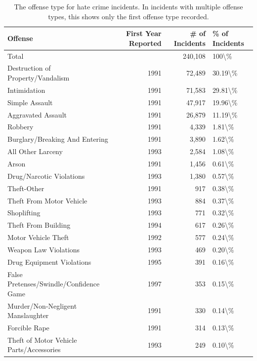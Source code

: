 \documentclass[
  12pt,
  openany]{book}
\begin{document}
\begin{longtable}[t]{lrrl}
\caption{\label{tab:hateOffense}The offense type for hate crime incidents. In incidents with multiple offense types, this shows only the first offense type recorded.}\\
\toprule
Offense & First Year Reported & \# of Incidents & \% of Incidents\\
\midrule
Total &  & 240,108 & 100\textbackslash{}\%\\
Destruction of Property/Vandalism & 1991 & 72,489 & 30.19\textbackslash{}\%\\
Intimidation & 1991 & 71,583 & 29.81\textbackslash{}\%\\
Simple Assault & 1991 & 47,917 & 19.96\textbackslash{}\%\\
Aggravated Assault & 1991 & 26,879 & 11.19\textbackslash{}\%\\
\addlinespace
Robbery & 1991 & 4,339 & 1.81\textbackslash{}\%\\
Burglary/Breaking And Entering & 1991 & 3,890 & 1.62\textbackslash{}\%\\
All Other Larceny & 1993 & 2,584 & 1.08\textbackslash{}\%\\
Arson & 1991 & 1,456 & 0.61\textbackslash{}\%\\
Drug/Narcotic Violations & 1993 & 1,380 & 0.57\textbackslash{}\%\\
\addlinespace
Theft-Other & 1991 & 917 & 0.38\textbackslash{}\%\\
Theft From Motor Vehicle & 1993 & 884 & 0.37\textbackslash{}\%\\
Shoplifting & 1993 & 771 & 0.32\textbackslash{}\%\\
Theft From Building & 1994 & 617 & 0.26\textbackslash{}\%\\
Motor Vehicle Theft & 1992 & 577 & 0.24\textbackslash{}\%\\
\addlinespace
Weapon Law Violations & 1993 & 469 & 0.20\textbackslash{}\%\\
Drug Equipment Violations & 1995 & 391 & 0.16\textbackslash{}\%\\
False Pretenses/Swindle/Confidence Game & 1997 & 353 & 0.15\textbackslash{}\%\\
Murder/Non-Negligent Manslaughter & 1991 & 330 & 0.14\textbackslash{}\%\\
Forcible Rape & 1991 & 314 & 0.13\textbackslash{}\%\\
\addlinespace
Theft of Motor Vehicle Parts/Accessories & 1993 & 249 & 0.10\textbackslash{}\%\\

\end{longtable}
\end{document}
